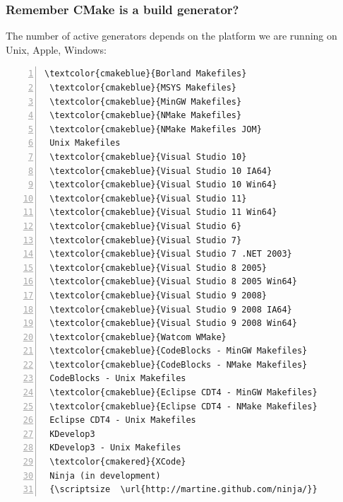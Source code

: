 \documentclass[compress,slidestop,table
              ]
               {beamer}
\begin{document}
\begin{frame}[fragile]
\frametitle{Remember CMake is a build \alert{generator}?}
The number of active generators depends on the platform
we are running on {Unix}, \textcolor{cmakered}{Apple},
\textcolor{cmakeblue}{Windows}:
\begin{multicols}{2}
\begin{Verbatim}[commandchars=\\\{\},fontsize=\scriptsize,numbers=left]
 \textcolor{cmakeblue}{Borland Makefiles}
 \textcolor{cmakeblue}{MSYS Makefiles}
 \textcolor{cmakeblue}{MinGW Makefiles}
 \textcolor{cmakeblue}{NMake Makefiles}
 \textcolor{cmakeblue}{NMake Makefiles JOM}
 Unix Makefiles
 \textcolor{cmakeblue}{Visual Studio 10}
 \textcolor{cmakeblue}{Visual Studio 10 IA64}
 \textcolor{cmakeblue}{Visual Studio 10 Win64}
 \textcolor{cmakeblue}{Visual Studio 11}
 \textcolor{cmakeblue}{Visual Studio 11 Win64}
 \textcolor{cmakeblue}{Visual Studio 6}
 \textcolor{cmakeblue}{Visual Studio 7}
 \textcolor{cmakeblue}{Visual Studio 7 .NET 2003}
 \textcolor{cmakeblue}{Visual Studio 8 2005}
 \textcolor{cmakeblue}{Visual Studio 8 2005 Win64}
 \textcolor{cmakeblue}{Visual Studio 9 2008}
 \textcolor{cmakeblue}{Visual Studio 9 2008 IA64}
 \textcolor{cmakeblue}{Visual Studio 9 2008 Win64}
 \textcolor{cmakeblue}{Watcom WMake}
 \textcolor{cmakeblue}{CodeBlocks - MinGW Makefiles}
 \textcolor{cmakeblue}{CodeBlocks - NMake Makefiles}
 CodeBlocks - Unix Makefiles
 \textcolor{cmakeblue}{Eclipse CDT4 - MinGW Makefiles}
 \textcolor{cmakeblue}{Eclipse CDT4 - NMake Makefiles}
 Eclipse CDT4 - Unix Makefiles
 KDevelop3
 KDevelop3 - Unix Makefiles
 \textcolor{cmakered}{XCode}
 Ninja (in development)
 {\scriptsize  \url{http://martine.github.com/ninja/}}
\end{Verbatim}

\end{multicols}
\end{frame}
\end{document}
